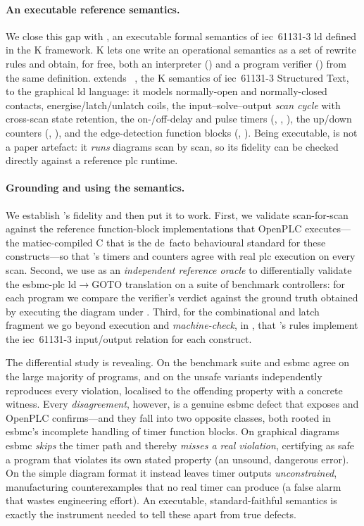 \paragraph{An executable reference semantics.} We close this gap with \kld{}, an
executable formal semantics of \gls{iec}~61131-3 \gls{ld} defined in the
\textsf{K} framework. \textsf{K} lets one write an operational semantics as a set
of rewrite rules and obtain, for free, both an interpreter () and a
program verifier () from the same definition. \kld{} extends
\kst{}~\cite{Wang2023}, the \textsf{K} semantics of \gls{iec}~61131-3
Structured Text, to the graphical \gls{ld} language: it models normally-open and
normally-closed contacts, energise/latch/unlatch coils, the input--solve--output
\emph{scan cycle} with cross-scan state retention, the on-/off-delay and pulse
timers (, , ), the up/down counters (,
), and the edge-detection function blocks (,
). Being executable, \kld{} is not a paper artefact: it \emph{runs}
diagrams scan by scan, so its fidelity can be checked directly against a reference
\gls{plc} runtime.

\paragraph{Grounding and using the semantics.} We establish \kld{}'s fidelity and
then put it to work. First, we validate \kld{} scan-for-scan against the reference
function-block implementations that OpenPLC executes---the \gls{matiec}-compiled C
that is the de~facto behavioural standard for these constructs---so that \kld{}'s
timers and counters agree with real \gls{plc} execution on every scan. Second, we
use \kld{} as an \emph{independent reference oracle} to differentially validate
the \gls{esbmc}-\gls{plc} \gls{ld}$\rightarrow$GOTO translation on a suite of
benchmark controllers: for each program we compare the verifier's verdict against
the ground truth obtained by executing the diagram under \kld{}. Third, for the
combinational and latch fragment we go beyond execution and \emph{machine-check},
in , that \kld{}'s rules implement the \gls{iec}~61131-3
input/output relation for each construct.

The differential study is revealing. On the benchmark suite \kld{} and
\gls{esbmc} agree on the large majority of programs, and on the unsafe variants
\kld{} independently reproduces every violation, localised to the offending
property with a concrete witness. Every \emph{disagreement}, however, is a genuine
\gls{esbmc} defect that \kld{} exposes and OpenPLC confirms---and they fall into
two opposite classes, both rooted in \gls{esbmc}'s incomplete handling of timer
function blocks. On graphical diagrams \gls{esbmc} \emph{skips} the timer path and
thereby \emph{misses a real violation}, certifying as safe a program that
violates its own stated property (an unsound, dangerous error). On the simple
diagram format it instead leaves timer outputs \emph{unconstrained}, manufacturing
counterexamples that no real timer can produce (a false alarm that wastes
engineering effort). An executable, standard-faithful semantics is exactly the
instrument needed to tell these apart from true defects.

